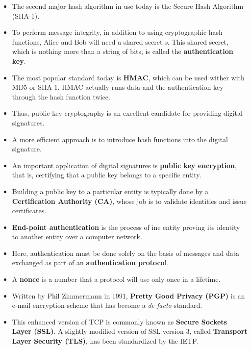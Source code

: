 \begin{itemize}
\item
The second major hash algorithm in use today is the Secure Hash Algorithm (SHA-1).

\item
To perform message integrity, in addition to using cryptographic hash functions, Alice and Bob will need a shared secret \textit{s}. This shared secret, which is nothing more than a string of bits, is called the \textbf{authentication key}.

\item
The most popular standard today is \textbf{HMAC}, which can be used wither with MD5 or SHA-1. HMAC actually runs data and the authentication key through the hash function twice.

\item
Thus, public-key cryptography is an excellent candidate for providing digital signatures.

\item
A more efficient approach is to introduce hash functions into the digital signature.

\item
An important application of digital signatures is \textbf{public key encryption}, that is, certifying that a public key belongs to a specific entity.

\item
Building a public key to a particular entity is typically done by a \textbf{Certification Authority (CA)}, whose job is to validate identities and issue certificates.

\item
\textbf{End-point authentication} is the process of ine entity proving its identity to another entity over a computer network.

\item
Here, authentication must be done solely on the basis of messages and data exchanged as part of an \textbf{authentication protocol}.

\item
A \textbf{nonce} is a number that a protocol will use only once in a lifetime.

\item
Written by Phil Zimmermann in 1991, \textbf{Pretty Good Privacy (PGP)} is an e-mail encryption scheme that has become a \textit{de facto} standard.

\item
This enhanced version of TCP is commonly known as \textbf{Secure Sockets Layer (SSL)}. A slightly modified version of SSL version 3, called \textbf{Transport Layer Security (TLS)}, has been standardized by the IETF.


\end{itemize}
